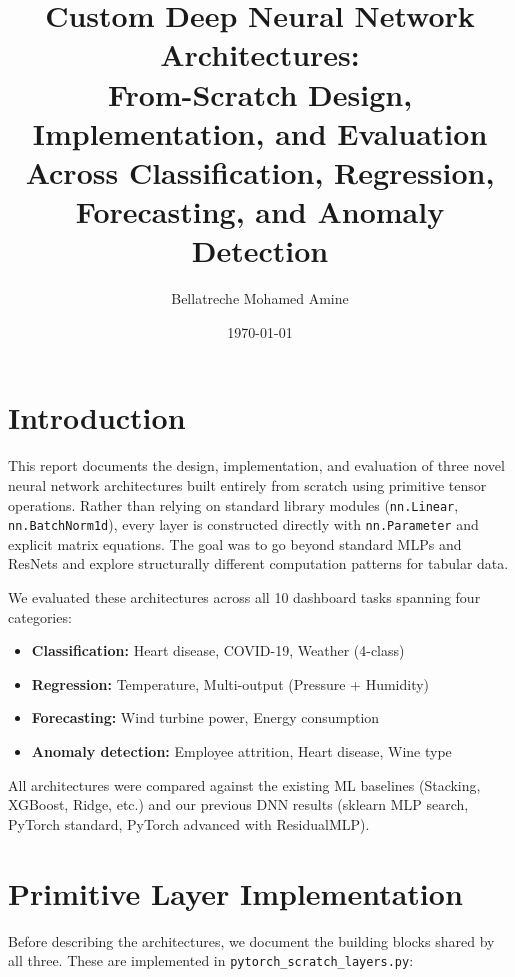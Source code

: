 \documentclass[11pt,a4paper]{article}
\title{Custom Deep Neural Network Architectures:\\From-Scratch Design, Implementation, and Evaluation\\{\large Across Classification, Regression, Forecasting, and Anomaly Detection}}
\author{Bellatreche Mohamed Amine}
\date{\today}
\begin{document}
\maketitle
\vspace{-0.8em}

\section{Introduction}

This report documents the design, implementation, and evaluation of three novel neural network architectures built entirely from scratch using primitive tensor operations. Rather than relying on standard library modules (\texttt{nn.Linear}, \texttt{nn.BatchNorm1d}), every layer is constructed directly with \texttt{nn.Parameter} and explicit matrix equations. The goal was to go beyond standard MLPs and ResNets and explore structurally different computation patterns for tabular data.

We evaluated these architectures across all 10 dashboard tasks spanning four categories:
\begin{itemize}[leftmargin=1.2em,itemsep=0.15em]
    \item \textbf{Classification:} Heart disease, COVID-19, Weather (4-class)
    \item \textbf{Regression:} Temperature, Multi-output (Pressure + Humidity)
    \item \textbf{Forecasting:} Wind turbine power, Energy consumption
    \item \textbf{Anomaly detection:} Employee attrition, Heart disease, Wine type
\end{itemize}

All architectures were compared against the existing ML baselines (Stacking, XGBoost, Ridge, etc.) and our previous DNN results (sklearn MLP search, PyTorch standard, PyTorch advanced with ResidualMLP).

\section{Primitive Layer Implementation}

Before describing the architectures, we document the building blocks shared by all three. These are implemented in \texttt{pytorch\_scratch\_layers.py}:
\end{document}
